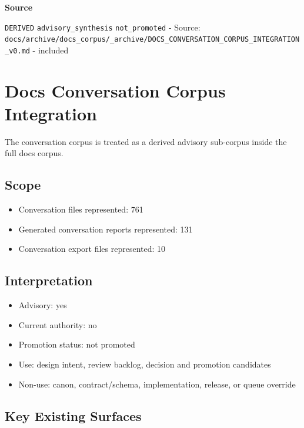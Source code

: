 \documentclass[10.5pt,a4paper,openany]{book}
\newcommand{\vonecallout}[3]{\par\medskip\noindent\begingroup\setlength{\fboxsep}{7pt}\colorbox{DomCalloutBg}{\parbox{0.94\linewidth}{\textbf{\textcolor{#1}{#2}}\par #3}}\endgroup\par\medskip}
\begin{document}
\vonecallout{DomSlate}{Source}{\texttt{DERIVED} \texttt{advisory\_\allowbreak{}synthesis} \texttt{not\_\allowbreak{}promoted} -\allowbreak{} Source: \texttt{docs/\allowbreak{}archive/\allowbreak{}docs\_\allowbreak{}corpus/\allowbreak{}\_\allowbreak{}archive/\allowbreak{}DOCS\_\allowbreak{}CONVERSATION\_\allowbreak{}CORPUS\_\allowbreak{}INTEGRATION\_\allowbreak{}v0.\allowbreak{}md} -\allowbreak{} included}

\section{Docs Conversation Corpus Integration}

The conversation corpus is treated as a derived advisory sub-\allowbreak{}corpus inside the full docs corpus.\allowbreak{}


\subsection{Scope}

\begin{itemize}
\item Conversation files represented: 761
\item Generated conversation reports represented: 131
\item Conversation export files represented: 10
\end{itemize}

\subsection{Interpretation}

\begin{itemize}
\item Advisory: yes
\item Current authority: no
\item Promotion status: not promoted
\item Use: design intent, review backlog, decision and promotion candidates
\item Non-\allowbreak{}use: canon, contract/\allowbreak{}schema, implementation, release, or queue override
\end{itemize}

\subsection{Key Existing Surfaces}
\end{document}
